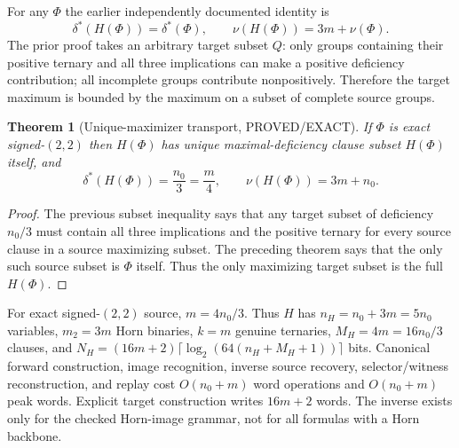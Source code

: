 \documentclass[11pt]{article}
\newtheorem{theorem}{Theorem}
\begin{document}
For any $\Phi$ the earlier independently documented identity is
\[
\delta^*(H(\Phi))=\delta^*(\Phi),\qquad
\nu(H(\Phi))=3m+\nu(\Phi).
\]
The prior proof takes an arbitrary target subset $Q$: only groups containing their positive ternary and all three implications can make a positive deficiency contribution; all incomplete groups contribute nonpositively. Therefore the target maximum is bounded by the maximum on a subset of complete source groups.
\begin{theorem}[Unique-maximizer transport, PROVED/EXACT]
If $\Phi$ is exact signed-$(2,2)$ then $H(\Phi)$ has unique maximal-deficiency clause subset $H(\Phi)$ itself, and
\[
\delta^*(H(\Phi))=\frac{n_0}{3}=\frac m4,\qquad
\nu(H(\Phi))=3m+n_0.
\]
\end{theorem}
\begin{proof}
The previous subset inequality says that any target subset of deficiency $n_0/3$ must contain all three implications and the positive ternary for every source clause in a source maximizing subset. The preceding theorem says that the only such source subset is $\Phi$ itself. Thus the only maximizing target subset is the full $H(\Phi)$.
\end{proof}
For exact signed-$(2,2)$ source, $m=4n_0/3$. Thus $H$ has $n_H=n_0+3m=5n_0$ variables, $m_2=3m$ Horn binaries, $k=m$ genuine ternaries, $M_H=4m=16n_0/3$ clauses, and $N_H=(16m+2)\lceil\log_2(64(n_H+M_H+1))\rceil$ bits. Canonical forward construction, image recognition, inverse source recovery, selector/witness reconstruction, and replay cost $O(n_0+m)$ word operations and $O(n_0+m)$ peak words. Explicit target construction writes $16m+2$ words. The inverse exists only for the checked Horn-image grammar, not for all formulas with a Horn backbone.
\end{document}
